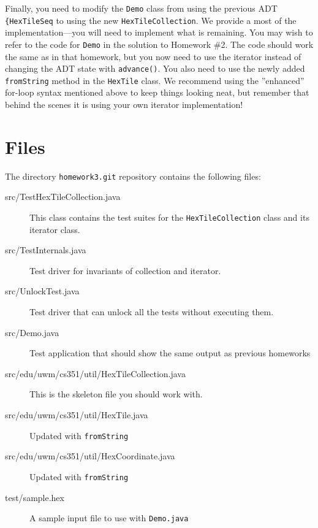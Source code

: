 \documentclass[11pt]{article}
\begin{document}
Finally, you need to modify the \texttt{Demo} class from
using the previous ADT \verb|{HexTileSeq|
to using the new \texttt{HexTileCollection}.
We provide a most of the implementation---you will need to implement
what is remaining.  You may wish to refer to the code for
\verb|Demo| in the solution to Homework \#2.  The code should work the same
as in that homework, but you now need to use the iterator instead of changing the ADT state with \texttt{advance()}.
You also need to use the newly added \texttt{fromString} method in the \texttt{HexTile} class.
We recommend using the ''enhanced'' for-loop syntax mentioned above to keep things looking neat, but remember that behind the scenes it is using your own
iterator implementation!

\section{Files}

The directory \verb|homework3.git| repository
contains the following files:
\begin{description}
\item[src/TestHexTileCollection.java] This class contains the test suites for the
\verb|HexTileCollection| class and its iterator class.
\item[src/TestInternals.java] Test driver for invariants of collection and iterator.
\item[src/UnlockTest.java] Test driver that can unlock all the tests without executing them.
\item[src/Demo.java] Test application that should show the same output as previous homeworks
\item[src/edu/uwm/cs351/util/HexTileCollection.java] This is the skeleton file you should
work with.
\item[src/edu/uwm/cs351/util/HexTile.java] Updated with \texttt{fromString}
\item[src/edu/uwm/cs351/util/HexCoordinate.java] Updated with \texttt{fromString}
\item[test/sample.hex] A sample input file to use with \texttt{Demo.java}
\end{description}
\end{document}
